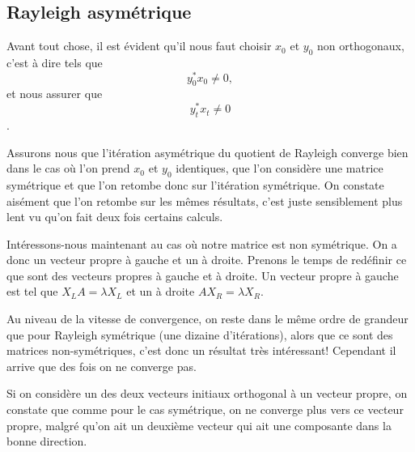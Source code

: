 
\subsection*{Rayleigh asymétrique}

	Avant tout chose, il est évident qu'il nous faut choisir $x_0$ et $y_0$ non orthogonaux, c'est à dire tels que $$y_0^* x_0 \neq 0,$$ et nous assurer que $$y_t^* x_t \neq 0$$.
	
	Assurons nous que l'itération asymétrique du quotient de Rayleigh converge bien dans le cas où l'on prend $x_0$ et $y_0$ identiques, que l'on considère une matrice symétrique et que l'on retombe donc sur l'itération symétrique. On constate aisément que l'on retombe sur les mêmes résultats, c'est juste sensiblement plus lent vu qu'on fait deux fois certains calculs. 
	
	Intéressons-nous maintenant au cas où notre matrice est non symétrique. On a donc un vecteur propre à gauche et un à droite. Prenons le temps de redéfinir ce que sont des vecteurs propres à gauche et à droite. Un vecteur propre à gauche est tel que $X_L A = \lambda X_L$ et un à droite $A X_R = \lambda X_R$. 
	
	Au niveau de la vitesse de convergence, on reste dans le même ordre de grandeur que pour Rayleigh symétrique  (une dizaine d'itérations), alors que ce sont des matrices non-symétriques, c'est donc un résultat très intéressant! Cependant il arrive que des fois on ne converge pas. 
	
	Si on considère un des deux vecteurs initiaux orthogonal à un vecteur propre, on constate que comme pour le cas symétrique, on ne converge plus vers ce vecteur propre, malgré qu'on ait un deuxième vecteur qui ait une composante dans la bonne direction.   
	
